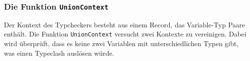 \subsubsection{Die Funktion {\tt UnionContext}}

Der Kontext des Typcheckers besteht aus einem Record, das Variable-Typ
Paare enth\"alt. Die Funktion {\tt UnionContext} versucht zwei
Kontexte zu vereinigen. Dabei wird \"uberpr\"uft, dass es keine zwei
Variablen mit unterschiedlichen Typen gibt, was einen Typeclash
ausl\"osen w\"urde.



